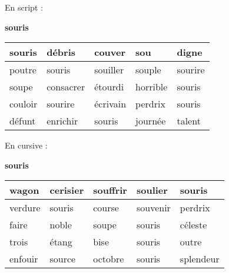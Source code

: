 \documentclass[a4paper, 11pt,oneside, fleqn]{article}
\begin{document}
\begin{onehalfspace}
\large\noindent En script :
\begin{center} {\huge \textbf{souris}}
\vspace{0.25cm}\\
\begin{tabulary}{17cm}{|h|h|h|h|h|}
\hline
souris & débris & couver & sou & digne \\
\hline
poutre & souris & souiller & souple & sourire \\
\hline
soupe & consacrer & étourdi & horrible & souris \\
\hline
couloir & sourire & écrivain & perdrix & souris \\
\hline
défunt & enrichir & souris & journée & talent \\
\hline
\end{tabulary}
\end{center}
\vspace{0.5cm}

\large\noindent En cursive :
\begin{center}
{\huge \textbf {{\cursive souris}}}
\vspace{0.25cm}\\
\begin{tabulary}{17cm}{|i|i|i|i|i|}
\hline
wagon & cerisier & souffrir & soulier & souris \\
\hline
verdure & souris & course & souvenir & perdrix \\
\hline
faire & noble & soupe & souris & céleste \\
\hline
trois & étang & bise & souris & outre \\
\hline
enfouir & source & octobre & souris & splendeur \\
\hline
\end{tabulary}
\end{center}

\end{onehalfspace}
\end{document}
